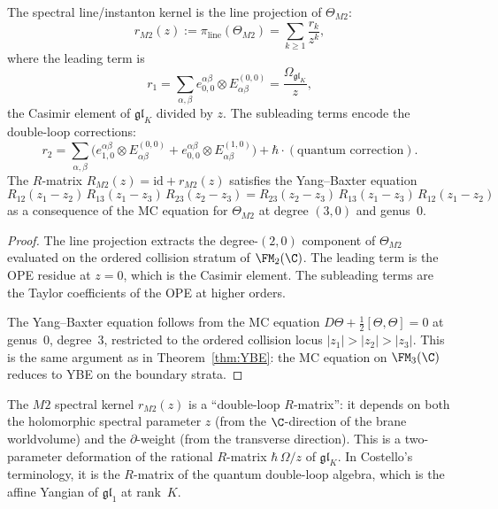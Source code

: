 \begin{theorem}
The spectral line/instanton kernel is the line projection of
$\Theta_{M2}$:
\begin{equation}%
r_{M2}(z)
:= \pi_{\mathrm{line}}(\Theta_{M2})
= \sum_{k\ge 1}\frac{r_k}{z^k},
\end{equation}
where the leading term is
\begin{equation}%
r_1
= \sum_{\alpha,\beta}
e^{\alpha\beta}_{0,0}\otimes E^{(0,0)}_{\alpha\beta}
= \frac{\Omega_{\mathfrak{gl}_K}}{z},
\end{equation}
the Casimir element of $\mathfrak{gl}_K$ divided by $z$.
The subleading terms encode the double-loop corrections:
\begin{equation}%
r_2
= \sum_{\alpha,\beta}\bigl(
e^{\alpha\beta}_{1,0}\otimes E^{(0,0)}_{\alpha\beta}
+ e^{\alpha\beta}_{0,0}\otimes E^{(1,0)}_{\alpha\beta}
\bigr)
+ \hbar\cdot(\text{quantum correction}).
\end{equation}
The $R$-matrix $R_{M2}(z) = \mathrm{id} + r_{M2}(z)$
satisfies the Yang--Baxter equation
\begin{equation}%
R_{12}(z_1-z_2)\,R_{13}(z_1-z_3)\,R_{23}(z_2-z_3)
= R_{23}(z_2-z_3)\,R_{13}(z_1-z_3)\,R_{12}(z_1-z_2)
\end{equation}
as a consequence of the MC equation for $\Theta_{M2}$ at
degree $(3,0)$ and genus~$0$.
\end{theorem}

\begin{proof}
The line projection extracts the degree-$(2,0)$ component of
$\Theta_{M2}$ evaluated on the ordered collision stratum
of $\FM_2(\C)$. The leading term is the OPE residue at
$z=0$, which is the Casimir element. The subleading terms
are the Taylor coefficients of the OPE at higher orders.

The Yang--Baxter equation follows from the MC equation
$D\Theta+\tfrac{1}{2}[\Theta,\Theta]=0$ at genus~$0$,
degree~$3$, restricted to the ordered collision locus
$|z_1|>|z_2|>|z_3|$. This is the same argument as in
Theorem~\ref{thm:YBE}: the MC equation on $\FM_3(\C)$
reduces to YBE on the boundary strata.
\end{proof}

\begin{remark}
The $M2$ spectral kernel $r_{M2}(z)$ is a ``double-loop
$R$-matrix'': it depends on both the holomorphic spectral
parameter $z$ (from the $\C$-direction of the brane worldvolume)
and the $\partial$-weight (from the transverse direction). This
is a two-parameter deformation of the rational $R$-matrix
$\hbar\,\Omega/z$ of $\mathfrak{gl}_K$. In Costello's terminology, it
is the $R$-matrix of the quantum double-loop algebra, which is
the affine Yangian of $\mathfrak{gl}_1$ at rank~$K$.
\end{remark}

